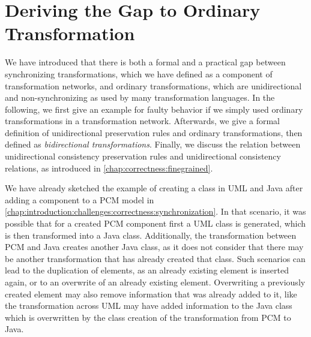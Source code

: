 \section{Deriving the Gap to Ordinary Transformation}

We have introduced that there is both a formal and a practical gap between synchronizing transformations, which we have defined as a component of transformation networks, and ordinary transformations, which are unidirectional and non-synchronizing as used by many transformation languages.
In the following, we first give an example for faulty behavior if we simply used ordinary transformations in a transformation network.
Afterwards, we give a formal definition of unidirectional preservation rules and ordinary transformations, then defined as \emph{bidirectional transformations}.
Finally, we discuss the relation between unidirectional consistency preservation rules and unidirectional consistency relations, as introduced in \autoref{chap:correctness:finegrained}.


We have already sketched the example of creating a class in \gls{UML} and Java after adding a component to a \gls{PCM} model in \autoref{chap:introduction:challenges:correctness:synchronization}.
In that scenario, it was possible that for a created \gls{PCM} component first a \gls{UML} class is generated, which is then transformed into a Java class.
Additionally, the transformation between \gls{PCM} and Java creates another Java class, as it does not consider that there may be another transformation that has already created that class.
Such scenarios can lead to the duplication of elements, as an already existing element is inserted again, or to an overwrite of an already existing element.
Overwriting a previously created element may also remove information that was already added to it, like the transformation across \gls{UML} may have added information to the Java class which is overwritten by the class creation of the transformation from \gls{PCM} to Java.

